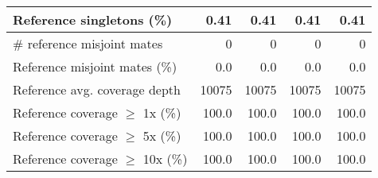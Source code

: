 \documentclass[12pt,a4paper]{article}
\begin{document}
\begin{table}[ht]
\begin{center}
\begin{tabular}{|l*{4}{|r}|}
Reference singletons (\%) & 0.41 & 0.41 & 0.41 & 0.41 \\ \hline
\# reference misjoint mates & 0 & 0 & 0 & 0 \\ \hline
Reference misjoint mates (\%) & 0.0 & 0.0 & 0.0 & 0.0 \\ \hline
Reference avg. coverage depth & 10075 & 10075 & 10075 & 10075 \\ \hline
Reference coverage $\geq$ 1x (\%) & 100.0 & 100.0 & 100.0 & 100.0 \\ \hline
Reference coverage $\geq$ 5x (\%) & 100.0 & 100.0 & 100.0 & 100.0 \\ \hline
Reference coverage $\geq$ 10x (\%) & 100.0 & 100.0 & 100.0 & 100.0 \\ \hline
\end{tabular}
\end{center}
\end{table}
\end{document}
